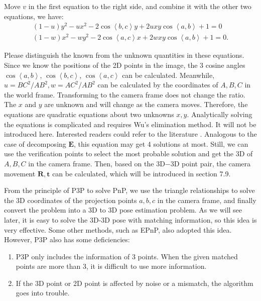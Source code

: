 Move $v$ in the first equation to the right side, and combine it with the other two equations, we have:
\begin{equation}
\begin{array}{l}
\left( {1 - u} \right){y^2} - u{x^2} - 2 \cos \left\langle b,c \right \rangle y + 2uxy\cos \left\langle a,b \right \rangle  + 1 = 0 \\
\left( {1 - w} \right){x^2} - w{y^2} - 2 \cos \left\langle a,c \right \rangle x + 2wxy\cos \left\langle a,b \right \rangle  + 1 = 0.
\end{array}
\end{equation}

Please distinguish the known from the unknown quantities in these equations. Since we know the positions of the 2D points in the image, the 3 cosine angles $\cos \left \langle a,b \right \rangle$, $\cos \left\langle b,c \right \rangle$, $\cos \left \langle a,c \right \rangle$ can be calculated. Meanwhile, $u=BC^2/AB^2, w=AC^2/AB^2$ can be calculated by the coordinates of $A, B, C$ in the world frame. Transforming to the camera frame does not change the ratio. The $x$ and $y$ are unknown and will change as the camera moves. Therefore, the equations are quadratic equations about two unknowns $x, y$. Analytically solving the equations is complicated and requires Wu's elimination method. It will not be introduced here. Interested readers could refer to the literature \cite{GaoHouTangEtAl2003}. Analogous to the case of decomposing $\mathbf{E}$, this equation may get 4 solutions at most. Still, we can use the verification points to select the most probable solution and get the 3D of $A, B, C$ in the camera frame. Then, based on the 3D−3D point pair, the camera movement $\mathbf{R}, \mathbf{t}$ can be calculated, which will be introduced in section 7.9.

From the principle of P3P to solve PnP, we use the triangle relationships to solve the 3D coordinates of the projection points $a, b, c$ in the camera frame, and finally convert the problem into a 3D to 3D pose estimation problem. As we will see later, it is easy to solve the 3D-3D pose with matching information, so this idea is very effective. Some other methods, such as EPnP, also adopted this idea. However, P3P also has some deficiencies:

\begin{enumerate}
	\item P3P only includes the information of 3 points. When the given matched points are more than 3, it is difficult to use more information.
	\item If the 3D point or 2D point is affected by noise or a mismatch, the algorithm goes into trouble.
\end{enumerate}

